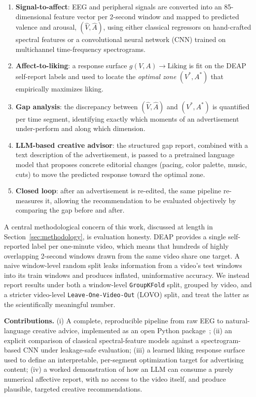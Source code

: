 \documentclass[conference]{IEEEtran}
\begin{document}
\begin{enumerate}
\item \textbf{Signal-to-affect}: EEG and peripheral signals are converted
into an 85-dimensional feature vector per 2-second window and mapped to
predicted valence and arousal, $(\hat V, \hat A)$, using either classical
regressors on hand-crafted spectral features or a convolutional neural
network (CNN) trained on multichannel time-frequency spectrograms.
\item \textbf{Affect-to-liking}: a response surface
$g(V, A) \rightarrow \text{Liking}$ is fit on the DEAP self-report labels
and used to locate the \emph{optimal zone} $(V^{*}, A^{*})$ that empirically
maximizes liking.
\item \textbf{Gap analysis}: the discrepancy between $(\hat V, \hat A)$ and
$(V^{*}, A^{*})$ is quantified per time segment, identifying exactly which
moments of an advertisement under-perform and along which dimension.
\item \textbf{LLM-based creative advisor}: the structured gap report,
combined with a text description of the advertisement, is passed to a
pretrained language model that proposes concrete editorial changes (pacing,
color palette, music, cuts) to move the predicted response toward the
optimal zone.
\item \textbf{Closed loop}: after an advertisement is re-edited, the same
pipeline re-measures it, allowing the recommendation to be evaluated
objectively by comparing the gap before and after.
\end{enumerate}

A central methodological concern of this work, discussed at length in
Section~\ref{sec:methodology}, is evaluation honesty. DEAP provides a
single self-reported label per one-minute video, which means that hundreds
of highly overlapping 2-second windows drawn from the same video share one
target. A naive window-level random split leaks information from a video's
test windows into its train windows and produces inflated, uninformative
accuracy. We instead report results under both a window-level
\texttt{GroupKFold} split, grouped by video, and a stricter video-level
\texttt{Leave-One-Video-Out} (LOVO) split, and treat the latter as the
scientifically meaningful number.

\textbf{Contributions.} (i) A complete, reproducible pipeline from raw EEG
to natural-language creative advice, implemented as an open Python
package~\cite{sourcecoderepo}; (ii) an explicit comparison of classical spectral-feature models
against a spectrogram-based CNN under leakage-safe evaluation; (iii) a
learned liking response surface used to define an interpretable,
per-segment optimization target for advertising content; (iv) a worked
demonstration of how an LLM can consume a purely numerical affective
report, with no access to the video itself, and produce plausible,
targeted creative recommendations.
\end{document}
